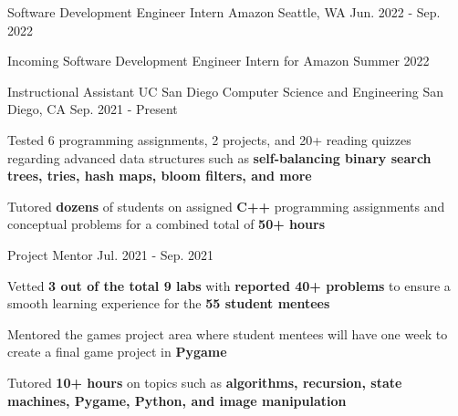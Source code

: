 

\begin{cventries}
  \cventry
    {Software Development Engineer Intern} %
    {Amazon} %
    {Seattle, WA} %
    {Jun. 2022 - Sep. 2022} %
    {
      \begin{cvitems} %
        \item {Incoming Software Development Engineer Intern for Amazon Summer 2022}
      \end{cvitems}
    }


  \cvtwoentry
    {Instructional Assistant}
    {UC San Diego Computer Science and Engineering} %
    {San Diego, CA} %
    {Sep. 2021 - Present}
    {
      \begin{cvitems}
        \item {Tested 6 programming assignments, 2 projects, and 20+ reading quizzes regarding advanced data structures such as \textbf{self-balancing binary search trees, tries, hash maps, bloom filters, and more}}
        \item {Tutored \textbf{dozens} of students on assigned \textbf{C++} programming assignments and conceptual problems for a combined total of \textbf{50+ hours}}
      \end{cvitems}
    }
    {Project Mentor} %
    {Jul. 2021 - Sep. 2021} %
    {
      \begin{cvitems} %
        \item {Vetted \textbf{3 out of the total 9 labs} with \textbf{reported 40+ problems} to ensure a smooth learning experience for the \textbf{55 student mentees}}
        \item {Mentored the games project area where student mentees will have one week to create a final game project in \textbf{Pygame}}
        \item {Tutored \textbf{10+ hours} on topics such as \textbf{algorithms, recursion, state machines, Pygame, Python, and image manipulation}}
      \end{cvitems}
    }


\end{cventries}
